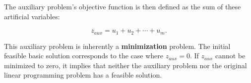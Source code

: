 \documentclass[unicode,11pt,a4paper,oneside,numbers=endperiod,openany]{scrartcl}
\begin{document}
The auxiliary problem's objective function is then defined as the sum of these artificial variables:

\[
 z_{aux} = u_1 + u_2 + \cdots + u_m.
\]

This auxiliary problem is inherently a \textbf{minimization} problem. The initial feasible basic solution corresponds to the case where \(z_{aux} = 0\). If \(z_{aux}\) cannot be minimized to zero, it implies that neither the auxiliary problem nor the original linear programming problem has a feasible solution.

%
%
%
%
\end{document}
